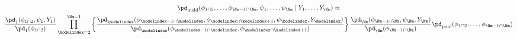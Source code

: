 \begin{multline}
  \pd_{\text{meld}}(\phi_{1 \cap 2}, \ldots, \phi_{\Nm - 1 \cap \Nm}, \psi_{1}, \ldots, \psi_{\Nm} \mid Y_{1}, \ldots, Y_{\Nm}) \propto \\ 
  \frac {
      \pd_{1} (\phi_{1 \cap 2}, \psi_{1}, Y_{1})
    } {
      \pd_{1}(\phi_{1 \cap 2})
    }
  \prod_{\modelindex = 2}^{\Nm - 1} \left\{
    \frac {
      \pd_{\modelindex} (\phi_{\modelindex - 1 \cap \modelindex}, \phi_{\modelindex \cap \modelindex + 1}, \psi_{\modelindex}, Y_{\modelindex})
    } {
      \pd_{\modelindex}(\phi_{\modelindex - 1 \cap \modelindex}, \phi_{\modelindex \cap \modelindex + 1})
    }
  \right\}
  \frac {
    \pd_{\Nm} (\phi_{\Nm - 1 \cap \Nm}, \psi_{\Nm}, Y_{\Nm})
  } {
    \pd_{\Nm}(\phi_{\Nm - 1 \cap \Nm})
  }
  \pd_{\text{pool}}(\phi_{1 \cap 2}, \ldots, \phi_{\Nm - 1 \cap \Nm}) 
  \label{eqn:dc-final-target}
\end{multline}
